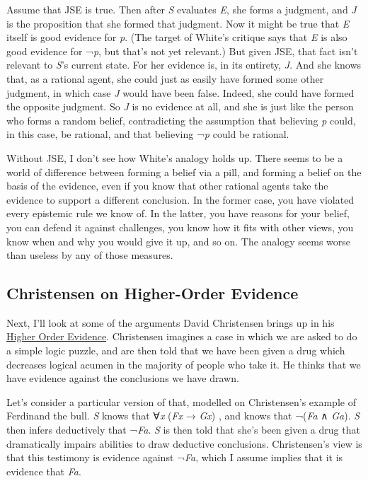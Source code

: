 \documentclass[
  10pt,
  letterpaper,
  DIV=11,
  numbers=noendperiod,
  twoside]{scrartcl}
\begin{document}
Assume that JSE is true. Then after \emph{S} evaluates \emph{E}, she
forms a judgment, and \emph{J} is the proposition that she formed that
judgment. Now it might be true that \emph{E} itself is good evidence for
\emph{p}. (The target of White's critique says that \emph{E} is also
good evidence for ¬\emph{p}, but that's not yet relevant.) But given
JSE, that fact isn't relevant to \emph{S}'s current state. For her
evidence is, in its entirety, \emph{J}. And she knows that, as a
rational agent, she could just as easily have formed some other
judgment, in which case \emph{J} would have been false. Indeed, she
could have formed the opposite judgment. So \emph{J} is no evidence at
all, and she is just like the person who forms a random belief,
contradicting the assumption that believing \emph{p} could, in this
case, be rational, and that believing ¬\emph{p} could be rational.

Without JSE, I don't see how White's analogy holds up. There seems to be
a world of difference between forming a belief via a pill, and forming a
belief on the basis of the evidence, even if you know that other
rational agents take the evidence to support a different conclusion. In
the former case, you have violated every epistemic rule we know of. In
the latter, you have reasons for your belief, you can defend it against
challenges, you know how it fits with other views, you know when and why
you would give it up, and so on. The analogy seems worse than useless by
any of those measures.

\subsection{Christensen on Higher-Order
Evidence}\label{christensen-on-higher-order-evidence}

Next, I'll look at some of the arguments David Christensen brings up in
his
\href{http://www.brown.edu/Departments/Philosophy/faculty/christensen/Higher-OrderEvidence.pdf}{Higher
Order Evidence}. Christensen imagines a case in which we are asked to do
a simple logic puzzle, and are then told that we have been given a drug
which decreases logical acumen in the majority of people who take it. He
thinks that we have evidence against the conclusions we have drawn.

Let's consider a particular version of that, modelled on Christensen's
example of Ferdinand the bull. \emph{S} knows that ∀\emph{x} (\emph{Fx}
→ \emph{Gx}) , and knows that ¬(\emph{Fa} ∧ \emph{Ga}). \emph{S} then
infers deductively that ¬\emph{Fa}. \emph{S} is then told that she's
been given a drug that dramatically impairs abilities to draw deductive
conclusions. Christensen's view is that this testimony is evidence
against ¬\emph{Fa}, which I assume implies that it is evidence that
\emph{Fa}.
\end{document}

